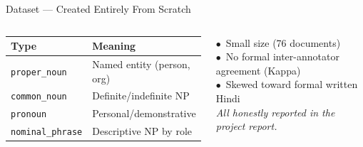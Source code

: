 \documentclass[aspectratio=169]{beamer}
\begin{document}
\begin{frame}{Dataset — Created Entirely From Scratch}
\begin{columns}[T]
      \begin{tcolorbox}[nbox={Mention Type Taxonomy}]
        \small
        \renewcommand{\arraystretch}{1.35}
        \begin{tabular}{p{2.2cm} p{3.2cm}}
          \toprule
          \textbf{Type} & \textbf{Meaning}\\
          \midrule
          \texttt{proper\_noun}    & Named entity (person, org)\\
          \texttt{common\_noun}    & Definite/indefinite NP\\
          \texttt{pronoun}         & Personal/demonstrative\\
          \texttt{nominal\_phrase} & Descriptive NP by role\\
          \bottomrule
        \end{tabular}
      \end{tcolorbox}

      \vspace{6pt}
      \begin{tcolorbox}[wbox={Known Limitations}]
        \small
        $\bullet$\ Small size (76 documents)\\
        $\bullet$\ No formal inter-annotator agreement (Kappa)\\
        $\bullet$\ Skewed toward formal written Hindi\\[3pt]
        \textit{All honestly reported in the project report.}
      \end{tcolorbox}
  \end{columns}
\end{frame}
\end{document}
